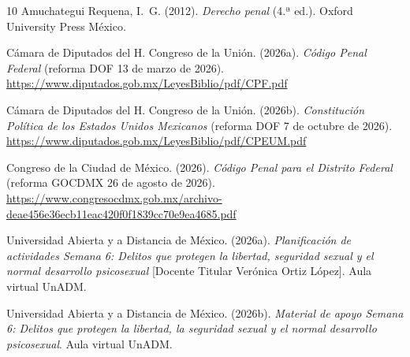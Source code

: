 \documentclass[spanish,letterpaper,oneside]{article}
\begin{document}
\vspace{10pt}
\begingroup\fontsize{10}{11.5}\selectfont
\setlength{\bibsep}{4pt}
\begin{thebibliography}{10}
Amuchategui Requena, I.~G. (2012). \emph{Derecho penal} (4.ª ed.). Oxford University Press México.

Cámara de Diputados del H. Congreso de la Unión. (2026a). \emph{Código Penal Federal} (reforma DOF 13 de marzo de 2026). \url{https://www.diputados.gob.mx/LeyesBiblio/pdf/CPF.pdf}

Cámara de Diputados del H. Congreso de la Unión. (2026b). \emph{Constitución Política de los Estados Unidos Mexicanos} (reforma DOF 7 de octubre de 2026). \url{https://www.diputados.gob.mx/LeyesBiblio/pdf/CPEUM.pdf}

Congreso de la Ciudad de México. (2026). \emph{Código Penal para el Distrito Federal} (reforma GOCDMX 26 de agosto de 2026). \url{https://www.congresocdmx.gob.mx/archivo-deae456e36ecb11eac420f0f1839cc70e9ea4685.pdf}

Universidad Abierta y a Distancia de México. (2026a). \emph{Planificación de actividades Semana 6: Delitos que protegen la libertad, seguridad sexual y el normal desarrollo psicosexual} [Docente Titular Verónica Ortiz López]. Aula virtual UnADM.

Universidad Abierta y a Distancia de México. (2026b). \emph{Material de apoyo Semana 6: Delitos que protegen la libertad, la seguridad sexual y el normal desarrollo psicosexual}. Aula virtual UnADM.
\end{thebibliography}
\endgroup
\end{document}

